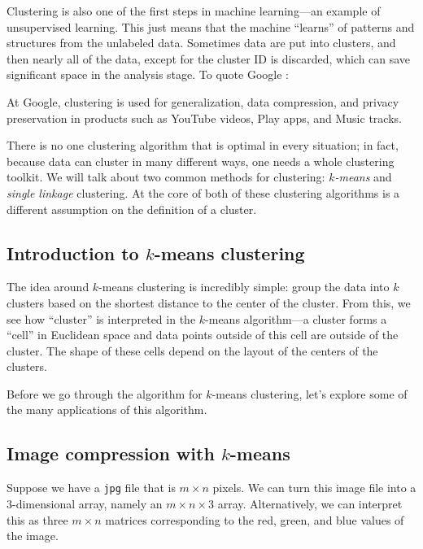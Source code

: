 \documentclass[a4paper, 12pt]{article}
\numberwithin{equation}{section}
\numberwithin{figure}{section}
\theoremstyle{definition}
\begin{document}
Clustering is also one of the first steps in machine learning---an example of
unsupervised learning. This just means that the machine ``learns'' of patterns
and structures from the unlabeled data. Sometimes data are put into clusters,
and then nearly all of the data, except for the cluster ID is discarded, which
can save significant space in the analysis stage. To quote Google \cite{Google}:

\begin{displayquote}
	At Google, clustering is used for generalization, data compression, and
	privacy preservation in products such as YouTube videos, Play apps, and
	Music tracks.
\end{displayquote}

There is no one clustering algorithm that is optimal in every situation; in
fact, because data can cluster in many different ways, one needs a whole
clustering toolkit. We will talk about two common methods for clustering:
\textit{$k$-means} and \textit{single linkage} clustering. At the core of both
of these clustering algorithms is a different assumption on the definition of a
cluster. 

\subsection{Introduction to $k$-means clustering}

The idea around $k$-means clustering is incredibly simple: group the data into
$k$ clusters based on the shortest distance to the center of the cluster. From
this, we see how ``cluster'' is interpreted in the $k$-means algorithm---a
cluster forms a ``cell'' in Euclidean space and data points outside of this cell
are outside of the cluster. The shape of these cells depend on the layout of the
centers of the clusters. 

Before we go through the algorithm for $k$-means clustering, let's explore some
of the many applications of this algorithm. 

\subsection{Image compression with $k$-means}

Suppose we have a \texttt{jpg} file that is $m\times n$ pixels. We can turn this
image file into a $3$-dimensional array, namely an $m\times n\times 3$ array.
Alternatively, we can interpret this as three $m\times n$ matrices corresponding
to the red, green, and blue values of the image. 
\end{document}
